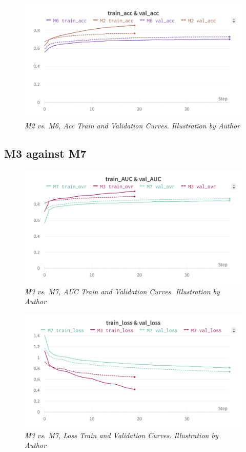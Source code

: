\begin{figure}[H]
\centering
    \includegraphics[width=\textwidth]{imatges/results/AccM2M6.png}
\caption[M2 vs. M6, Acc Train and Validation Curves]{\textit{M2 vs. M6, Acc Train and Validation Curves. Illustration by Author}}
\end{figure}

\newpage

\subsection{M3 against M7}

\begin{figure}[H]
\centering
    \includegraphics[width=\textwidth]{imatges/results/AUCM3M7.png}
\caption[M3 vs. M7, AUC Train and Validation Curves]{\textit{M3 vs. M7, AUC Train and Validation Curves. Illustration by Author}}
\end{figure}


\begin{figure}[H]
\centering
    \includegraphics[width=\textwidth]{imatges/results/LossM3M7.png}
\caption[M3 vs. M7, Loss Train and Validation Curves]{\textit{M3 vs. M7, Loss Train and Validation Curves. Illustration by Author}}
\end{figure}

